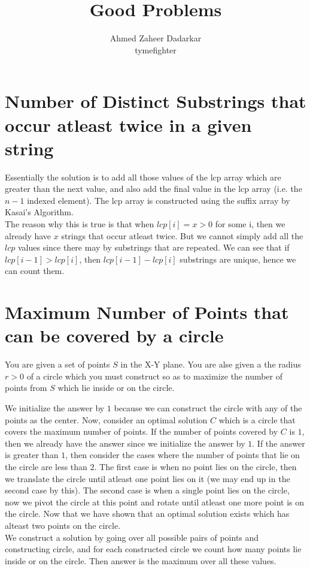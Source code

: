 \documentclass{article}
\title{Good Problems}
\author{
    Ahmed Zaheer Dadarkar\\
    tymefighter
}
\begin{document}
    \maketitle

    \section{
        Number of Distinct Substrings that occur atleast twice in a
        given string
    }

    Essentially the solution is to add all those values of the lcp array
    which are greater than the next value, and also add the final value in
    the lcp array (i.e. the $n - 1$ indexed element). The lcp array is
    constructed using the suffix array by Kasai's Algorithm. \\
    The reason why this is true is that when $lcp[i] = x > 0$ for some i, then
    we already have $x$ strings that occur atleast twice. But we cannot simply
    add all the $lcp$ values since there may by substrings that are repeated.
    We can see that if $lcp[i - 1] > lcp[i]$, then $lcp[i - 1] - lcp[i]$
    substrings are unique, hence we can count them.

    \section{Maximum Number of Points that can be covered by a circle}

    You are given a set of points $S$ in the X-Y plane. You are alse given
    a the radius $r > 0$ of a circle which you must construct so as to maximize
    the number of points from $S$ which lie inside or on the circle.

    We initialize the answer by $1$ because we can construct the circle with
    any of the points as the center. Now, consider an optimal solution $C$
    which is a circle that covers the maximum number of points. If the number
    of points covered by $C$ is $1$, then we already have the answer since we
    initialize the answer by $1$. If the answer is greater than $1$, then
    consider the cases where the number of points that lie on the circle are
    less than $2$. The first case is when no point lies on the circle,
    then we translate the circle until atleast one point lies on it (we may
    end up in the second case by this). The second case is when a single point
    lies on the circle, now we pivot the circle at this point and rotate until
    atleast one more point is on the circle. Now that we have shown that an
    optimal solution exists which has alteast two points on the circle. \\
    We construct a solution by going over all possible pairs of points and
    constructing circle, and for each constructed circle we count how many
    points lie inside or on the circle. Then answer is the maximum over all
    these values.
\end{document}
